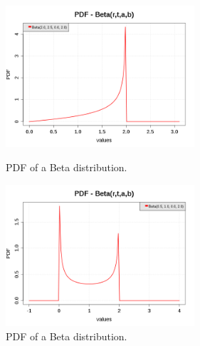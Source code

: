 \begin{figure}[H]
  \begin{minipage}{10cm}
    \begin{center}
      \includegraphics[width=7cm]{pdf_Beta_4.png}
      \caption{PDF of a Beta distribution.}
      \label{PDFBeta4}
    \end{center}
  \end{minipage}
  \hfill
  \begin{minipage}{10cm}
    \begin{center}
      \includegraphics[width=7cm]{pdf_Beta_5.png}
      \caption{PDF of a Beta distribution.}
      \label{PDFBeta5}
    \end{center}
  \end{minipage}
\end{figure}



